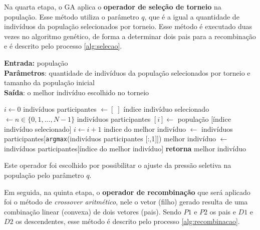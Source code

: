 \documentclass[a4paper, 12pt]{article}
\newenvironment{brprocess}[1][]
  {\begin{algorithm}[#1]
     \selectlanguage{brazilian}%
     \floatname{algorithm}{Processo}%
     \renewcommand{\algorithmicif}{\textbf{se}}%
     \renewcommand{\algorithmicfor}{\textbf{para}}%
     \renewcommand{\algorithmicdo}{\textbf{faça}}%
     \renewcommand{\algorithmicthen}{\textbf{faça}}%
     \renewcommand{\algorithmicend}{\textbf{fim}}%
     \renewcommand{\algorithmicwhile}{\textbf{enquanto}}%
     \renewcommand{\algorithmicelse}{\textbf{caso contrário}}%
  }
  {\end{algorithm}}
\begin{document}
Na quarta etapa, o GA aplica o \textbf{operador de seleção de torneio} na população. Esse método utiliza o parâmetro $q$, que é a igual a quantidade de indivíduos da população selecionados por torneio. Esse método é executado duas vezes no algoritmo genético, de forma a determinar dois pais para a recombinação e é descrito pelo processo \ref{alg:selecao}.
\begin{brprocess}[!ht]
    \cprotect\caption{Operador de seleção por torneio (\verb|selecao_torneio(populacao,|
    \verb|N, q_torneio)|}
    \textbf{Entrada:} população\\
    \textbf{Parâmetros}: quantidade de indivíduos da população selecionados por torneio e tamanho da população inicial\\
    \textbf{Saída}: o melhor indivíduo escolhido no torneio
    \begin{algorithmic}
            \State $i \gets 0$
            \State indivíduos participantes $\gets [\;]$
                \State índice indivíduo selecionado $\gets n \in \{0, 1, ..., N - 1\}$
                \State indivíduos participantes $[i] \gets$ população [índice indivíduo selecionado]
                \State $i \gets i + 1$
            \EndWhile
            \State indice do melhor indivíduo $\gets$ indivíduos participantes[\verb|argmax|(indivíduos participantes [:,1]])
            \State melhor indivíduo $\gets$ indivíduos participantes[índice do melhor indivíduo]
            \State \textbf{retorna} melhor indivíduo
    \end{algorithmic}
    \label{alg:selecao}
\end{brprocess}

Este operador foi escolhido por possibilitar o ajuste da pressão seletiva na população pelo parâmetro $q$.

Em seguida, na quinta etapa, o \textbf{operador de recombinação} que será aplicado foi o método de \textit{crossover aritmético}, nele o vetor (filho) gerado resulta de uma combinação linear (convexa)
de dois vetores (pais). Sendo $P1$ e $P2$ os pais e $D1$ e $D2$ os descendentes, esse método é descrito pelo processo \ref{alg:recombinacao}.
\end{document}
